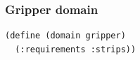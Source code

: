 \documentclass{ltx-talk}
\begin{document}
\begin{frame*}
\frametitle{Gripper domain}
\begin{lstlisting}
(define (domain gripper)
  (:requirements :strips))
\end{lstlisting}
\end{frame*}
\end{document}
